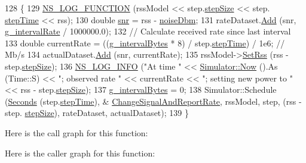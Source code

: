 \begin{DoxyCode}
128 \{
129   \hyperlink{log-macros-disabled_8h_a90b90d5bad1f39cb1b64923ea94c0761}{NS\_LOG\_FUNCTION} (rssModel << step.\hyperlink{structStep_a54f255b32f86ab9fced0a0002dcb9420}{stepSize} << step.
      \hyperlink{structStep_a9d7cdfbd213343951d23c3c4c61604bd}{stepTime} << rss);
130   \textcolor{keywordtype}{double} \hyperlink{lte__amc_8m_a7543c5e4e80c828b652e0c63e4a6de70}{snr} = rss - \hyperlink{wifi-manager-example_8cc_af9f95286ad3d5d533ca9d9b455e70398}{noiseDbm};
131   rateDataset.\hyperlink{classns3_1_1Gnuplot2dDataset_abd93f7c8fa2d1ed643c09d7fb8d5ef27}{Add} (snr, \hyperlink{wifi-manager-example_8cc_a15352b730cb23450ffdf71ed0d8d0a7e}{g\_intervalRate} / 1000000.0);
132   \textcolor{comment}{// Calculate received rate since last interval}
133   \textcolor{keywordtype}{double} currentRate = ((\hyperlink{wifi-manager-example_8cc_a76477e4410026bd7e3460fcd9e3f3847}{g\_intervalBytes} * 8) / step.\hyperlink{structStep_a9d7cdfbd213343951d23c3c4c61604bd}{stepTime}) / 1e6; \textcolor{comment}{// Mb/s}
134   actualDataset.\hyperlink{classns3_1_1Gnuplot2dDataset_abd93f7c8fa2d1ed643c09d7fb8d5ef27}{Add} (snr, currentRate);
135   rssModel->\hyperlink{classns3_1_1FixedRssLossModel_acf2422ae57b98a4618c8da2b564980b4}{SetRss} (rss - step.\hyperlink{structStep_a54f255b32f86ab9fced0a0002dcb9420}{stepSize});
136   \hyperlink{group__logging_gafbd73ee2cf9f26b319f49086d8e860fb}{NS\_LOG\_INFO} (\textcolor{stringliteral}{"At time "} << \hyperlink{group__simulator_gac3635e2e87f7ce316c89290ee1b01d0d}{Simulator::Now} ().As (Time::S) << \textcolor{stringliteral}{"; observed rate "} 
      << currentRate << \textcolor{stringliteral}{"; setting new power to "} << rss - step.\hyperlink{structStep_a54f255b32f86ab9fced0a0002dcb9420}{stepSize});
137   \hyperlink{wifi-manager-example_8cc_a76477e4410026bd7e3460fcd9e3f3847}{g\_intervalBytes} = 0;
138   Simulator::Schedule (\hyperlink{group__timecivil_ga33c34b816f8ff6628e33d5c8e9713b9e}{Seconds} (step.\hyperlink{structStep_a9d7cdfbd213343951d23c3c4c61604bd}{stepTime}), &
      \hyperlink{wifi-manager-example_8cc_adeb3e022073e20a0edcca5f97eec50d9}{ChangeSignalAndReportRate}, rssModel, step, (rss - step.
      \hyperlink{structStep_a54f255b32f86ab9fced0a0002dcb9420}{stepSize}), rateDataset, actualDataset);
139 \}
\end{DoxyCode}


Here is the call graph for this function\+:




Here is the caller graph for this function\+:


